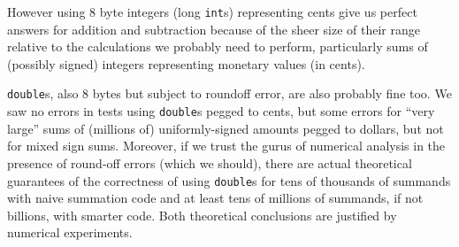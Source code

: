 \documentclass[11pt, oneside]{amsart}   	%
\begin{document}
However using 8 byte integers (long \texttt{int}s) representing cents give us perfect answers for addition and subtraction because of the sheer size of their range relative to the calculations we probably need to perform, particularly sums of (possibly signed) integers representing monetary values (in cents). 

\texttt{double}s, also 8 bytes but subject to roundoff error, are also probably fine too. We saw no errors in tests using \texttt{double}s pegged to cents, but some errors for ``very large'' sums of (millions of) uniformly-signed amounts pegged to dollars, but not for mixed sign sums. Moreover, if we trust the gurus of numerical analysis in the presence of round-off errors (which we should), there are actual theoretical guarantees of the correctness of using \texttt{double}s for tens of thousands of summands with naive summation code and at least tens of millions of summands, if not billions, with smarter code. Both theoretical conclusions are justified by numerical experiments. 
\end{document}
